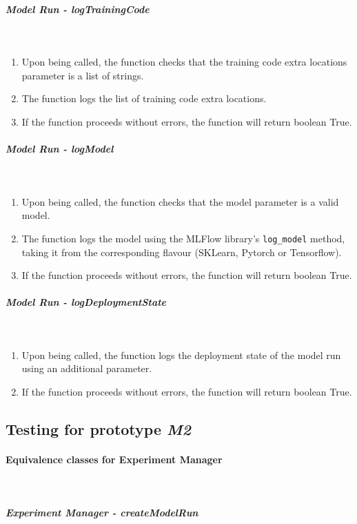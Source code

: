 \subparagraph{Model Run - logTrainingCode} \mbox{}\\

\begin{enumerate}
    \item Upon being called, the function checks that the training code extra locations parameter is a list of strings.
    \item The function logs the list of training code extra locations.
    \item If the function proceeds without errors, the function will return boolean True.
\end{enumerate}

\subparagraph{Model Run - logModel} \mbox{}\\

\begin{enumerate}
    \item Upon being called, the function checks that the model parameter is a valid model.
    \item The function logs the model using the MLFlow library's \texttt{log\_model} method, taking it from the corresponding flavour (SKLearn, Pytorch or Tensorflow).
    \item If the function proceeds without errors, the function will return boolean True.
\end{enumerate}

\subparagraph{Model Run - logDeploymentState} \mbox{}\\

\begin{enumerate}
    \item Upon being called, the function logs the deployment state of the model run using an additional parameter.
    \item If the function proceeds without errors, the function will return boolean True.
\end{enumerate}

\subsection{Testing for prototype \emph{M2}}

\paragraph{Equivalence classes for Experiment Manager}\mbox{}\\

\subparagraph{Experiment Manager - createModelRun} \mbox{}\\

